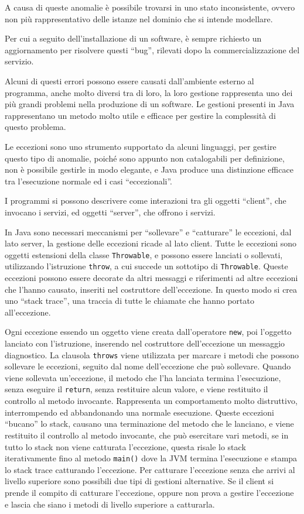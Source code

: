 \documentclass{article}
\numberwithin{equation}{subsection}
\begin{document}
A causa di queste anomalie è possibile trovarsi in uno stato inconsistente, ovvero non più rappresentativo delle istanze nel dominio che si intende modellare. 

Per cui a seguito dell'installazione di un software, è sempre richiesto un aggiornamento per risolvere questi ``bug'', rilevati dopo la commercializzazione del servizio. 

Alcuni di questi errori possono essere causati dall'ambiente esterno al programma, anche molto diversi tra di loro, la loro gestione rappresenta uno dei più grandi problemi 
nella produzione di un software. Le gestioni presenti in Java rappresentano un metodo molto utile e efficace per gestire la complessità di questo problema. 

Le eccezioni sono uno strumento supportato da alcuni linguaggi, per gestire questo tipo di anomalie, poiché sono appunto non catalogabili per definizione, non è possibile 
gestirle in modo elegante, e Java produce una distinzione efficace tra l'esecuzione normale ed i casi ``eccezionali''. 

I programmi si possono descrivere come interazioni tra gli oggetti ``client'', che invocano i servizi, ed oggetti ``server'', che offrono i servizi. 

In Java sono necessari meccanismi per ``sollevare'' e ``catturare'' le eccezioni, dal lato server, la gestione delle eccezioni ricade al lato client. 
Tutte le eccezioni sono oggetti estensioni della classe \verb|Throwable|, e possono essere lanciati o sollevati, utilizzando l'istruzione \verb|throw|, a cui succede un 
sottotipo di \verb|Throwable|. Queste eccezioni possono essere decorate da altri messaggi e riferimenti ad altre eccezioni che l'hanno causato, inseriti nel costruttore dell'eccezione. 
In questo modo si crea uno ``stack trace'', una traccia di tutte le chiamate che hanno portato all'eccezione. 


Ogni eccezione essendo un oggetto viene creata dall'operatore \verb|new|, poi l'oggetto lanciato con l'istruzione, inserendo nel costruttore dell'eccezione un messaggio diagnostico. 
La clausola \verb|throws| viene utilizzata per marcare i metodi che possono sollevare le eccezioni, seguito dal nome dell'eccezione che può sollevare. 
Quando viene sollevata un'eccezione, il metodo che l'ha lanciata termina l'esecuzione, senza eseguire il \verb|return|, senza restituire alcun valore, e viene restituito il 
controllo al metodo invocante. Rappresenta un comportamento molto distruttivo, interrompendo ed abbandonando una normale esecuzione. 
Queste eccezioni ``bucano'' lo stack, causano una terminazione del metodo che le lanciano, e viene restituito il controllo al metodo invocante, che può esercitare vari metodi, 
se in tutto lo stack non viene catturata l'eccezione, questa risale lo stack iterativamente fino al metodo \verb|main()| dove la JVM termina l'esecuzione e stampa lo stack trace 
catturando l'eccezione. 
Per catturare l'eccezione senza che arrivi al livello superiore sono possibili due tipi di gestioni alternative. Se il client si prende il compito di catturare l'eccezione, 
oppure non prova a gestire l'eccezione e lascia che siano i metodi di livello superiore a catturarla. 
\end{document}
